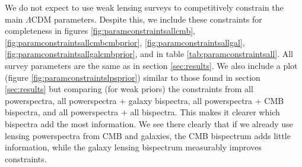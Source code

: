 \documentclass[11pt]{article} %
\begin{document}
We do not expect to use weak lensing surveys to competitively constrain the main $\Lambda$CDM parameters. Despite this, we include these constraints for completeness in figures \ref{fig:paramconstraintsallcmb}, \ref{fig:paramconstraintsallcmbcmbprior}, \ref{fig:paramconstraintsallgal}, \ref{fig:paramconstraintsallgalcmbprior}, and in table \ref{tab:paramconstraintsall}. All survey parameters are the same as in section \ref{sec:results}. We also include a plot (figure \ref{fig:paramconstraintslpsprior}) similar to those found in section \ref{sec:results} but comparing (for weak priors) the constraints from all powerspectra, all powerspectra + galaxy bispectra, all powerspectra + CMB bispectra, and all powerspectra + all bispectra. This makes it clearer which bispectra add the most information. We see there clearly that if we already use lensing powerspectra from CMB and galaxies, the CMB bispectrum adds little information, while the galaxy lensing bispectrum measurably improves constraints.
\end{document}
